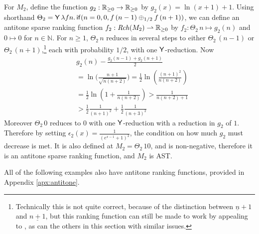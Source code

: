 \begin{example}
\label{ex:unbiased random walk}
For $M_2$, define the function $g_2 : \mathbb{R}_{{\geq}0} \to \mathbb{R}_{{\geq}0}$ by $g_2(x) = \ln(x+1) + 1$.
Using shorthand 
$\Theta_2 = \mathsf{Y} \, \lambda f n . \, 
\mathsf{if}(n = 0, 0, f \, (n - 1) \oplus_{1/2} f \, (n + 1))$, 
we can define an antitone sparse ranking function $f_2 : \mathit{Rch}(M_2) \rightharpoonup \mathbb{R}_{{\geq}0}$ 
by
\(
f_2: {\Theta_2} \, n \mapsto 
g_2(n)
\)
and
$0 \mapsto 0$
for $n \in \mathbb N$.
For $n \geq 1$, $\Theta_2 \, n$ reduces in several steps to either $\Theta_2 \, (n-1)$ or $\Theta_2 \, (n+1)$,\footnote{Technically this is not quite correct, because of the distinction between $\underline n + 1$ and $\underline{n + 1}$, but this ranking function can still be made to work by appealing to , as can the others in this section with similar issues.} each with probability $1/2$, with one $\mathsf{Y}$-reduction.
Now
\begin{align*}%
& g_2(n) - \frac{g_2(n-1) + g_2(n+1)} 2 \\
  &=  \ln \Big(\frac{n+1}{\sqrt{n(n+2)}}\Big) 
  =  \frac 1 2 \ln\left(\frac{(n+1)^2}{n(n+2)}\right) \\
  &=  \frac 1 2 \ln\left(1 + \frac 1 {n(n+2)}\right) 
  >  \frac 1 {n(n+2) + 1} \\
  &>  \frac 1 2 \frac 1 {(n+1)^2} + \frac 1 2 \frac 1 {(n+3)^2}
\end{align*}
Moreover $\Theta_2 \, 0$ reduces to $0$ with one $\mathsf{Y}$-reduction with a reduction in $g_2$ of $1$.
Therefore by setting $\epsilon_2(x) = \frac 1 {(e^{x-1}+1)^2}$, the condition on how much $g_2$ must decrease is met. It is also defined at $M_2 = \Theta_2 \, 10$, and is non-negative, therefore it is an antitone sparse ranking function, and $M_2$ is AST.
\end{example}

All of the following examples also have antitone ranking functions, provided in Appendix \ref{apx:antitone}.

\iffalse
Sampling from continuous distributions is an essential feature of statistical probabilistic programming languages. (See e.g.~Church \cite{DBLP:conf/uai/GoodmanMRBT08}, Stan \cite{carpenter2017stan}, Anglican \cite{DBLP:conf/pkdd/TolpinMW15}, Gen \cite{cusumano-towner2019Gen}, Pyro \cite{bingham2019Pyro}, Edward \cite{tran2016edward} and Turing \cite{ge2018Turing}.)
Methods of proving AST of probabilistic computation have been developed for probabilistic programs with discrete distributions (see e.g.~\cite{DBLP:journals/toplas/LagoG19,DBLP:journals/jacm/KaminskiKMO18,DBLP:conf/lics/OlmedoKKM16,DBLP:conf/lics/KobayashiLG19,DBLP:conf/mfcs/KaminskiK15,DBLP:series/mcs/McIverM05}).
To our knowledge, the problem of proving AST of probabilistic functional programs with continuous distribution is new.
\fi

